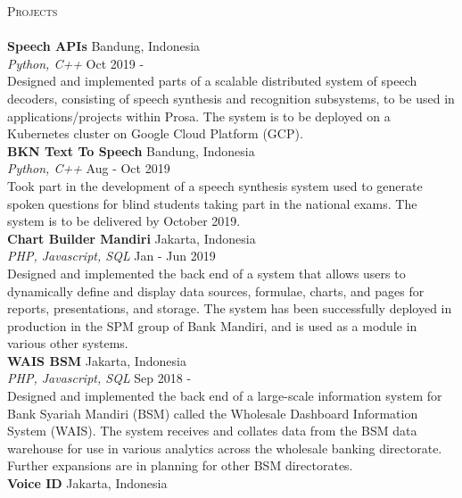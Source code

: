 \documentclass[a4paper]{article}
\newcommand{\lineunder} {
    \vspace*{-8pt} \\
    \hspace*{-18pt} \hrulefill \\
}
\newcommand{\header} [1] {
    {\hspace*{-18pt}\vspace*{6pt} \textsc{#1}}
    \vspace*{-6pt} \lineunder
}
\begin{document}
\header{Projects}
\vspace{2mm}
{\textbf{Speech APIs}} \hfill Bandung, Indonesia \\
{\sl Python, C++} \hfill Oct 2019 - \\
\vspace{1mm}
Designed and implemented parts of a scalable distributed system of speech
decoders, consisting of speech synthesis and recognition subsystems, to be used
in applications/projects within Prosa. The system is to be deployed on a
Kubernetes cluster on Google Cloud Platform (GCP).\\
\vspace*{3mm}
{\textbf{BKN Text To Speech}} \hfill Bandung, Indonesia \\
{\sl Python, C++} \hfill Aug - Oct 2019 \\
\vspace*{1mm}
Took part in the development of a speech synthesis system used to generate
spoken questions for blind students taking part in the national exams. The
system is to be delivered by October 2019.\\
\vspace*{3mm}
{\textbf{Chart Builder Mandiri}} \hfill Jakarta, Indonesia \\
{\sl PHP, Javascript, SQL} \hfill Jan - Jun 2019 \\
\vspace*{1mm}
Designed and implemented the back end of a system that allows users to
dynamically define and display data sources, formulae, charts, and pages for
reports, presentations, and storage. The system has been successfully deployed
in production in the SPM group of Bank Mandiri, and is used as a module in
various other systems.\\
\vspace*{3mm}
{\textbf{WAIS BSM}} \hfill Jakarta, Indonesia \\
{\sl PHP, Javascript, SQL} \hfill Sep 2018 - \\
\vspace*{1mm}
Designed and implemented the back end of a large-scale information system for
Bank Syariah Mandiri (BSM) called the Wholesale Dashboard Information System
(WAIS). The system receives and collates data from the BSM data warehouse for
use in various analytics across the wholesale banking directorate. Further
expansions are in planning for other BSM directorates.\\
\vspace*{3mm}
{\textbf{Voice ID}} \hfill Jakarta, Indonesia \\
\end{document}
